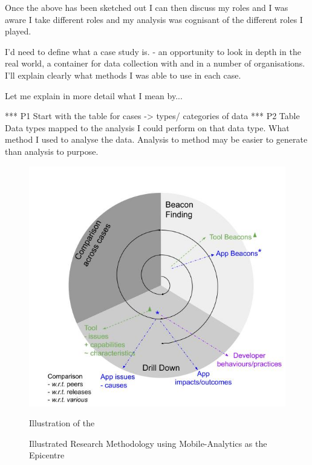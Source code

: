Once the above has been sketched out I can then discuss my roles and I was aware I take different roles and my analysis was cognisant of the different roles I played.

I'd need to define what a case study is. - an opportunity to look in depth in the real world, a container for data collection with and in a number of organisations. I'll explain clearly what methods I was able to use in each case. 

Let me explain in more detail what I mean by... 

*** P1 Start with the table for cases -> types/ categories of data 
*** P2 Table Data types mapped to the analysis I could perform on that data type. What method I used to analyse the data.
Analysis to method may be easier to generate than analysis to purpose.

\begin{figure}
    \centering
    \includegraphics[width=14cm]{images/my/Illustrated-Research-Methodology-using-Mobile-Analytics-as-the-Epicentre-v0-2.jpeg}
    \caption{Illustrated Research Methodology using Mobile-Analytics as the Epicentre}
    Illustration of the 
    \label{fig:Illustrated-Research-Methodology-using-Mobile-Analytics-as-the-Epicentre}
\end{figure}


